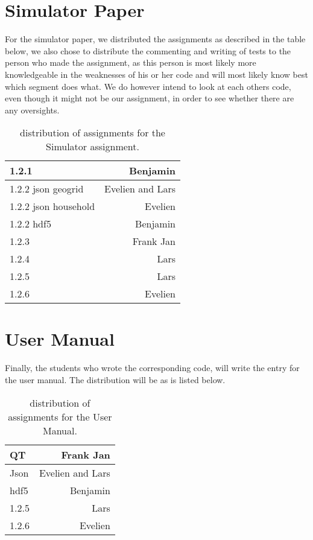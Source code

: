 \documentclass{article}
\begin{document}
\section{Simulator Paper}
For the simulator paper, we distributed the assignments as described in the table below, we also chose to distribute the commenting and writing of tests to the person who made the assignment, as this person is most likely more knowledgeable in the weaknesses of his or her code and will most likely know best which segment does what. We do however intend to look at each others code, even though it might not be our assignment, in order to see whether there are any oversights.
\begin{table}[h!]
	\centering
	\begin{tabular}{| l | r |}
		\hline
		1.2.1 & Benjamin \\
		\hline
		1.2.2 json geogrid & Evelien and Lars \\
		\hline
		1.2.2 json household & Evelien \\
		\hline
		1.2.2 hdf5 & Benjamin \\
		\hline
		1.2.3 & Frank Jan \\
		\hline
		1.2.4 & Lars \\
		\hline
		1.2.5 & Lars \\
		\hline
		1.2.6 & Evelien \\
		\hline
	\end{tabular}
	\caption{distribution of assignments for the Simulator assignment.}
\end{table}
\newpage
\section{User Manual}
Finally, the students who wrote the corresponding code, will write the entry for the user manual. The distribution will be as is listed below.
\begin{table}[h!]
	\centering
	\begin{tabular}{| l | r |}
		\hline
		QT & Frank Jan \\
		\hline
		Json & Evelien and Lars \\
		\hline
		hdf5 & Benjamin \\
		\hline
		1.2.5 & Lars \\
		\hline
		1.2.6 & Evelien \\
		\hline
	\end{tabular}
	\caption{distribution of assignments for the User Manual.}
\end{table}
\end{document}
